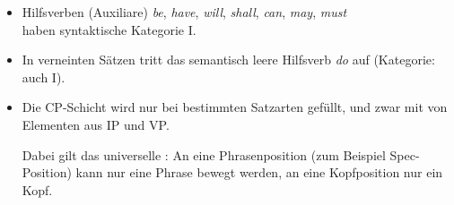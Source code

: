 {{\begin{itemize}[<+->]
\item Hilfsverben (Auxiliare) \emph{be}, \emph{have}, \emph{will}, \emph{shall}, \emph{can}, \emph{may}, \emph{must}\\
haben syntaktische Kategorie I.

\item In verneinten Sätzen tritt das semantisch leere Hilfsverb \emph{do} auf (Kategorie: auch I). 
\item Die CP-Schicht wird nur bei bestimmten Satzarten gefüllt, und zwar mit  von
Elementen aus IP und VP. 

Dabei gilt das universelle : An eine Phrasenposition (zum Beispiel Spec-Position) kann
nur eine Phrase bewegt werden, an eine Kopfposition nur ein Kopf.

\end{itemize}

}


}
